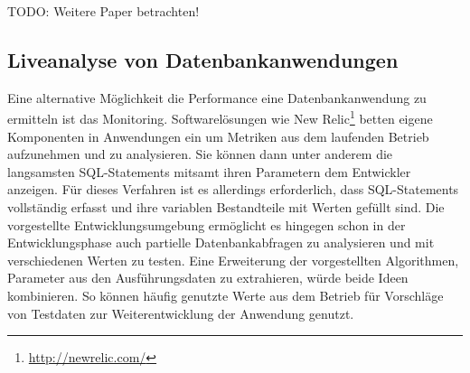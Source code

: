 TODO: Weitere Paper betrachten!

\subsection{Liveanalyse von Datenbankanwendungen}
Eine alternative Möglichkeit die Performance eine Datenbankanwendung zu ermitteln ist das Monitoring.
Softwarelösungen wie New Relic\footnote{\url{http://newrelic.com/}} betten eigene Komponenten in Anwendungen ein um Metriken aus dem laufenden Betrieb aufzunehmen und zu analysieren.
Sie können dann unter anderem die langsamsten SQL-Statements mitsamt ihren Parametern dem Entwickler anzeigen.
Für dieses Verfahren ist es allerdings erforderlich, dass SQL-Statements vollständig erfasst und ihre variablen Bestandteile mit Werten gefüllt sind.
Die vorgestellte Entwicklungsumgebung ermöglicht es hingegen schon in der Entwicklungsphase auch partielle Datenbankabfragen zu analysieren und mit verschiedenen Werten zu testen.
Eine Erweiterung der vorgestellten Algorithmen, Parameter aus den Ausführungsdaten zu extrahieren, würde beide Ideen kombinieren.
So können häufig genutzte Werte aus dem Betrieb für Vorschläge von Testdaten zur Weiterentwicklung der Anwendung genutzt.

